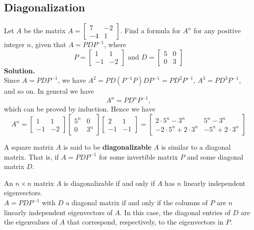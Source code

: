 \documentclass[10pt, a4paper]{article}
\begin{document}
\subsection{Diagonalization}
\begin{example}
    Let $A$ be the matrix \(
    A = \begin{bmatrix}
        7&-2\\
        -4&1
    \end{bmatrix}
    \).
    Find a formula for $A^n$ for any positive integer $n$, given that $A=PDP^{-1}$, where \[
    P = \begin{bmatrix}
        1&1\\
        -1&-2
    \end{bmatrix}
    \text{ and }
    D = \begin{bmatrix}
        5 & 0\\
        0 & 3
    \end{bmatrix}
    \]
    \textbf{Solution.} \\
    Since $A=PDP^{-1}$, we have $A^2 = PD(P^{-1} P)DP^{-1} = PD^2P^{-1}$, $A^3 = PD^3P^{-1}$, and so on. In general we have \[
    A^n = PD^nP^{-1},
    \]
    which can be proved by induction. Hence we have \[
    A^n = \begin{bmatrix}
        1&1\\
        -1&-2
    \end{bmatrix}
    \begin{bmatrix}
        5^n & 0\\
        0 & 3^n
    \end{bmatrix}
    \begin{bmatrix}
        2&1\\
        -1&-1
    \end{bmatrix}
    = \begin{bmatrix}
        2\cdot 5^n - 3^n & 5^n - 3^n\\
        -2\cdot5^n + 2\cdot 3^n & -5^n + 2\cdot3^n
    \end{bmatrix}
    \]
\end{example}
    \begin{definition}
        A square matrix $A$ is said to be \textbf{diagonalizable} $A$ is similar to a diagonal matrix. That is, if $A=PDP^{-1}$ for some invertible matrix $P$ and some diagonal matrix $D$.
    \end{definition}
    \begin{proposition}
        An $n\times n$ matrix $A$ is diagonalizable if and only if $A$ has $n$ linearly independent eigenvectors.\\
        $A=PDP^{-1}$ with $D$ a diagonal matrix if and only if the columns of $P$ are $n$ linearly independent eigenvectors of $A$.
        In this case, the diagonal entries of $D$ are the eigenvalues of $A$ that correspond, respectively, to the eigenvectors in $P$.
    \end{proposition}
\end{document}
